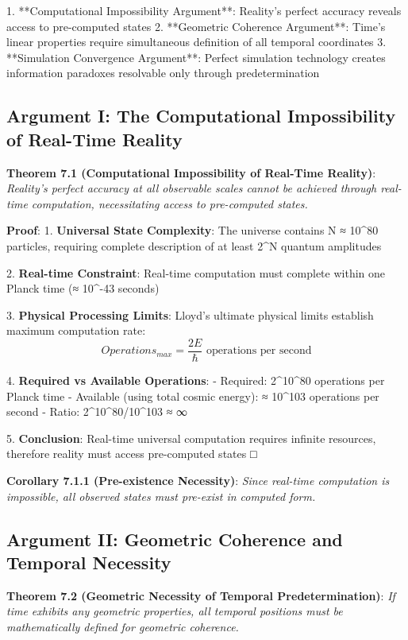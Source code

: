 \documentclass[12pt,a4paper]{article}
\theoremstyle{definition}
\begin{document}
{1. **Computational Impossibility Argument**: Reality's perfect accuracy reveals access to pre-computed states
2. **Geometric Coherence Argument**: Time's linear properties require simultaneous definition of all temporal coordinates
3. **Simulation Convergence Argument**: Perfect simulation technology creates information paradoxes resolvable only through predetermination

\subsection{Argument I: The Computational Impossibility of Real-Time Reality}

\textbf{Theorem 7.1 (Computational Impossibility of Real-Time Reality)}: \textit{Reality's perfect accuracy at all observable scales cannot be achieved through real-time computation, necessitating access to pre-computed states.}

\textbf{Proof}:
1. \textbf{Universal State Complexity}: The universe contains N ≈ 10^80 particles, requiring complete description of at least 2^N quantum amplitudes

2. \textbf{Real-time Constraint}: Real-time computation must complete within one Planck time (≈ 10^-43 seconds)

3. \textbf{Physical Processing Limits}: Lloyd's ultimate physical limits establish maximum computation rate:
   $$Operations_{max} = \frac{2E}{\hbar} \text{ operations per second}$$

4. \textbf{Required vs Available Operations}:
   - Required: 2^{10^{80}} operations per Planck time
   - Available (using total cosmic energy): ≈ 10^{103} operations per second
   - Ratio: 2^{10^{80}}/10^{103} ≈ ∞

5. \textbf{Conclusion}: Real-time universal computation requires infinite resources, therefore reality must access pre-computed states □

\textbf{Corollary 7.1.1 (Pre-existence Necessity)}: \textit{Since real-time computation is impossible, all observed states must pre-exist in computed form.}

\subsection{Argument II: Geometric Coherence and Temporal Necessity}

\textbf{Theorem 7.2 (Geometric Necessity of Temporal Predetermination)}: \textit{If time exhibits any geometric properties, all temporal positions must be mathematically defined for geometric coherence.}

}
\end{document}
